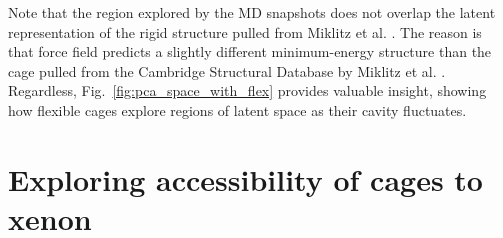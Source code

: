 \documentclass[journal=jacsat,manuscript=article]{achemso}
\begin{document}
{Note that the region explored by the MD snapshots does not overlap the latent representation of the rigid structure pulled from Miklitz et al. \cite{miklitz2017computational}. The reason is that force field predicts a slightly different minimum-energy structure than the cage pulled from the Cambridge Structural Database by Miklitz et al. \cite{miklitz2017computational}. Regardless, Fig.~\ref{fig:pca_space_with_flex} provides valuable insight, showing how flexible cages explore regions of latent space as their cavity fluctuates.
}

\clearpage

\section{\color{red}Exploring accessibility of cages to xenon}
\label{sec:inaccessibility}
\end{document}
